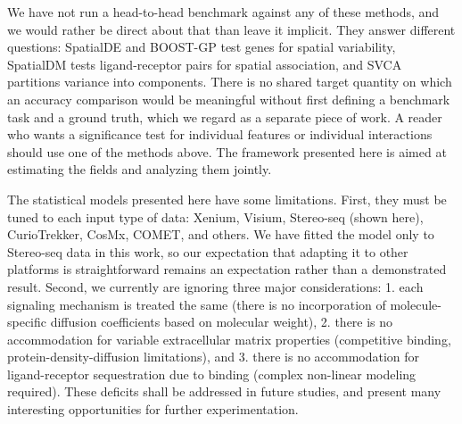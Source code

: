 \documentclass[10pt,letterpaper]{article}
\begin{document}
We have not run a head-to-head benchmark against any of these methods, and we would rather be direct about that than leave it implicit. They answer different questions: SpatialDE and BOOST-GP test genes for spatial variability, SpatialDM tests ligand-receptor pairs for spatial association, and SVCA partitions variance into components. There is no shared target quantity on which an accuracy comparison would be meaningful without first defining a benchmark task and a ground truth, which we regard as a separate piece of work. A reader who wants a significance test for individual features or individual interactions should use one of the methods above. The framework presented here is aimed at estimating the fields and analyzing them jointly.

The statistical models presented here have some limitations. First, they must be tuned to each input type of data: Xenium, Visium, Stereo-seq (shown here), CurioTrekker, CosMx, COMET, and others. We have fitted the model only to Stereo-seq data in this work, so our expectation that adapting it to other platforms is straightforward remains an expectation rather than a demonstrated result. Second, we currently are ignoring three major considerations: 1. each signaling mechanism is treated the same (there is no incorporation of molecule-specific diffusion coefficients based on molecular weight), 2. there is no accommodation for variable extracellular matrix properties (competitive binding, protein-density-diffusion limitations), and 3. there is no accommodation for ligand-receptor sequestration due to binding (complex non-linear modeling required). These deficits shall be addressed in future studies, and present many interesting opportunities for further experimentation.
\end{document}
